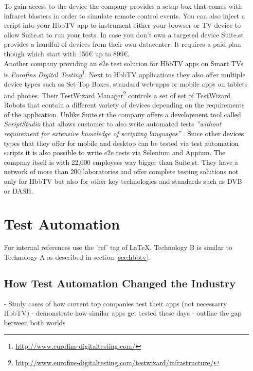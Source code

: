 To gain access to the device the company provides a setup box that comes with infraret blasters
in order to simulate remote control events. You can also inject a script into your HbbTV app
to instrument either your browser or TV device to allow Suite.st to run your tests. In case
you don't own a targeted device Suite.st provides a handful of devices from their own datacenter.
It requires a paid plan though which start with 156\euro{} up to 899\euro{}.\\
Another company providing an e2e test solution for HbbTV apps on Smart TVs is \textit{Eurofins Digital Testing}\footnote{\url{http://www.eurofins-digitaltesting.com/}}.
Next to HbbTV applications they also offer multiple device types such as Set-Top Boxes, standard
web-apps or mobile apps on tablets and phones. Their TestWizard Manager\footnote{\url{http://www.eurofins-digitaltesting.com/testwizard/infrastructure/}}
controls a set of set of TestWizard Robots that contain a different variety of devices depending
on the requirements of the application. Unlike Suite.st the company offers a development tool
called \textit{ScriptStudio} that allows customer to also write automated tests \textit{''without
requirement for extensive knowledge of scripting languages''} \cite{scriptstudio}. Since other
devices types that they offer for mobile and desktop can be tested via test automation scripts
it is also possible to write e2e tests via Selenium and Appium. The company itself is with
22,000 employees way bigger than Suite.st. They have a network of more than 200 laboratories and
offer complete testing solutions not only for HbbTV but also for other key technologies and standards
such as DVB or DASH.

\section{Test Automation\label{sec:testautomation}}

For internal references use the 'ref' tag of LaTeX. Technology B is similar to Technology A
as described in section \ref{sec:hbbtv}.

\subsection{How Test Automation Changed the Industry\label{sec:howitchanged}}

- Study cases of how current top companies test their apps (not necessarry HbbTV)
- demonstrate how similar apps get tested these days
- outline the gap between both worlds


